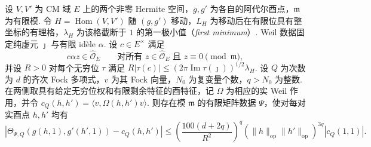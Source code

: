 \begin{lemma}
\label{lem:c-kernel-sparse-average}
\emitthmsource
设 $V,V'$ 为 CM 域 $E$ 上的两个非零 Hermite 空间，$g,g'$ 为各自的阿代尔酉点，$\mathfrak m$ 为有限模. 令 $H=\operatorname{Hom}(V,V')$ 随 $(g,g')$ 移动，$L_H$ 为移动后在有限位具有整坐标的有理格，$\lambda_H$ 为该格截断于 $1$ 的第一极小值（\emph{first minimum}）. Weil 数据固定纯虚元 $\jmath{}$ 与有限 idèle $\alpha$. 设 $c\in E^\times$ 满足
\[
 c\alpha z\in\widehat{\mathcal O}_E
 \qquad\text{对所有 }z\in\widehat{\mathcal O}_E
                  \text{ 且 }z\equiv0\pmod{\mathfrak m},
\]
并设 $R>0$ 对每个无穷位 $\tau$ 满足 $R|\tau(c)|\le (2\pi\operatorname{Im}\tau(\jmath{}))^{1/2}\lambda_H$. 设 $Q$ 为次数为 $d$ 的齐次 Fock 多项式，$v$ 为其 Fock 向量，$N_0$ 为复变量个数，$q>N_0$ 为整数. 在两侧取具有给定无穷位权和有限剩余特征的酉特征，记 $\Omega$ 为相应的实 Weil 作用，并令 $c_Q(h,h')=\langle v,\Omega(h,h')v\rangle$. 则存在模 $\mathfrak m$ 的有限矩阵数据 $\Psi$，使对每对实酉点 $h,h'$ 均有
\[
 \left|\Theta_{\Psi,Q}(g(h,1),g'(h',1))-c_Q(h,h')\right|
 \le
 \left(\frac{100(d+2q)}{R^2}\right)^q
 (\|h\|_{\mathrm{op}}\|h'\|_{\mathrm{op}})^{3q}|c_Q(1,1)|.
\]
\end{lemma}

